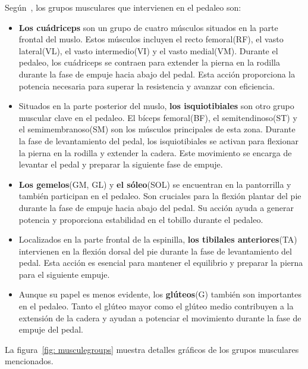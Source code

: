 \vspace{10pt}
Según~\cite{Losmúscu21}, los grupos musculares que intervienen en el pedaleo son:

\begin{itemize}
    \item \textbf{Los cuádriceps} son un grupo de cuatro músculos situados en la parte frontal del muslo. Estos músculos incluyen el recto femoral(RF), el vasto lateral(VL), el vasto intermedio(VI) y el vasto medial(VM). Durante el pedaleo, los cuádriceps se contraen para extender la pierna en la rodilla durante la fase de empuje hacia abajo del pedal. Esta acción proporciona la potencia necesaria para superar la resistencia y avanzar con eficiencia.
    
    \item Situados en la parte posterior del muslo, \textbf{los isquiotibiales} son otro grupo muscular clave en el pedaleo. El bíceps femoral(BF), el semitendinoso(ST) y el semimembranoso(SM) son los músculos principales de esta zona. Durante la fase de levantamiento del pedal, los isquiotibiales se activan para flexionar la pierna en la rodilla y extender la cadera. Este movimiento se encarga de levantar el pedal y preparar la siguiente fase de empuje.
    
    \item \textbf{Los gemelos}(GM, GL) y \textbf{el sóleo}(SOL) se encuentran en la pantorrilla y también participan en el pedaleo. Son cruciales para la flexión plantar del pie durante la fase de empuje hacia abajo del pedal. Su acción ayuda a generar potencia y proporciona estabilidad en el tobillo durante el pedaleo.
    
    \item Localizados en la parte frontal de la espinilla, \textbf{los tibilales anteriores}(TA) intervienen en la flexión dorsal del pie durante la fase de levantamiento del pedal. Esta acción es esencial para mantener el equilibrio y preparar la pierna para el siguiente empuje.
    
    \item Aunque su papel es menos evidente, los \textbf{glúteos}(G) también son importantes en el pedaleo. Tanto el glúteo mayor como el glúteo medio contribuyen a la extensión de la cadera y ayudan a potenciar el movimiento durante la fase de empuje del pedal.
\end{itemize}

\vspace{10pt}
La figura~\ref{fig: musculegroups} muestra detalles gráficos de los grupos musculares mencionados.

